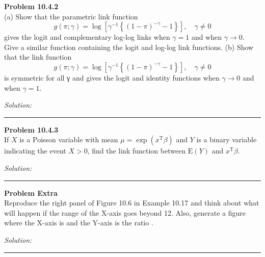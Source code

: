 \documentclass[a4paper, 11pt]{article}
\newenvironment{problem}[2][Problem]
    { \begin{mdframed}[backgroundcolor=gray!20] \textbf{#1 #2} \\}
    {  \end{mdframed}}
\newenvironment{solution}
    {\textit{Solution:}}
    {}
\begin{document}
\begin{problem}{10.4.2}
	(a) Show that the parametric link function
	$$g(\pi ; \gamma)=\log \left[\gamma^{-1}\left\{(1-\pi)^{-\gamma}-1\right\}\right], \quad \gamma \neq 0$$
	gives the logit and complementary log-log links when $\gamma=1$ and when $\gamma \rightarrow 0$.
	Give a similar function containing the logit and log-log link functions.
	(b) Show that the link function
	$$g(\pi ; \gamma)=\log \left[\gamma^{-1}\left\{(1-\pi)^{-\gamma}-1\right\}\right], \quad \gamma \neq 0$$
	is symmetric for all γ and gives the logit and identity functions when $\gamma \rightarrow 0$ and when $\gamma=1$.
\end{problem}
\begin{solution}


\end{solution}

\noindent\rule{7in}{2.8pt}
\begin{problem}{10.4.3}
	If $X$ is a Poisson variable with mean $\mu=\exp \left(x^{\mathrm{T}} \beta\right)$ and $Y$ is a binary variable indicating
	the event $X > 0$, find the link function between $\mathrm{E}(Y)$ and $x^{\mathrm{T}} \beta$.

\end{problem}
\begin{solution}
	
\end{solution}

\noindent\rule{7in}{2.8pt}
\begin{problem}{Extra}
Reproduce the right panel of Figure 10.6 in Example 10.17 and think about what will happen if the range of the X-axis goes beyond 12. Also, generate a figure where the X-axis is and the Y-axis is the ratio .

\end{problem}
\begin{solution}

\end{solution}

\noindent\rule{7in}{2.8pt}
\end{document}
